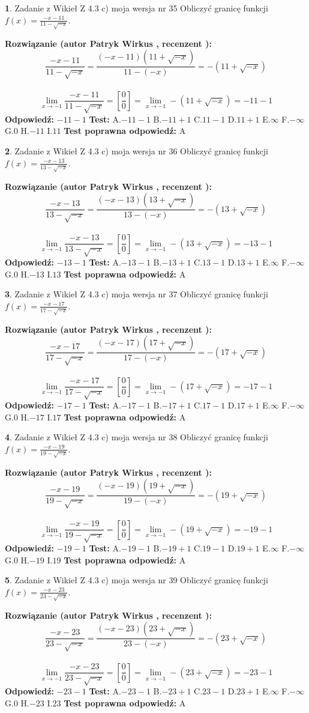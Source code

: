 \documentclass[12pt, a4paper]{article}
\theoremstyle{definition} %
\newtheorem{zad}{}
\newcommand{\zadStart}[1]{\begin{zad}#1\newline}
\newcommand{\zadStop}{\end{zad}}
\newcommand{\rozwStart}[2]{\noindent \textbf{Rozwiązanie (autor #1 , recenzent #2): }\newline}
\newcommand{\rozwStop}{\newline}
\newcommand{\odpStart}{\noindent \textbf{Odpowiedź:}\newline}
\newcommand{\odpStop}{\newline}
\newcommand{\testStart}{\noindent \textbf{Test:}\newline}
\newcommand{\testStop}{\newline}
\newcommand{\kluczStart}{\noindent \textbf{Test poprawna odpowiedź:}\newline}
\newcommand{\kluczStop}{\newline}
\begin{document}
\zadStart{Zadanie z Wikieł Z 4.3 c) moja wersja nr 35}
Obliczyć granicę funkcji $f(x)=\frac{-x-11}{11-\sqrt{-x}}$.
\zadStop
\rozwStart{Patryk Wirkus}{}
$$\frac{-x-11}{11-\sqrt{-x}}=\frac{(-x-11)(11+\sqrt{-x})}{11-(-x)}=-(11+\sqrt{-x})$$
\\
$$\lim\limits_{x\to-1}\frac{-x-11}{11-\sqrt{-x}}=[\frac{0}{0}]=\lim\limits_{x\to-1}-(11+\sqrt{-x}) =-11-1$$
\rozwStop
\odpStart
$-11-1$
\odpStop
\testStart
A.$-11-1$
B.$-11+1$
C.$11-1$
D.$11+1$
E.$\infty$
F.$-\infty$
G.$0$
H.$-11$
I.$11$
\testStop
\kluczStart
A
\kluczStop



\zadStart{Zadanie z Wikieł Z 4.3 c) moja wersja nr 36}
Obliczyć granicę funkcji $f(x)=\frac{-x-13}{13-\sqrt{-x}}$.
\zadStop
\rozwStart{Patryk Wirkus}{}
$$\frac{-x-13}{13-\sqrt{-x}}=\frac{(-x-13)(13+\sqrt{-x})}{13-(-x)}=-(13+\sqrt{-x})$$
\\
$$\lim\limits_{x\to-1}\frac{-x-13}{13-\sqrt{-x}}=[\frac{0}{0}]=\lim\limits_{x\to-1}-(13+\sqrt{-x}) =-13-1$$
\rozwStop
\odpStart
$-13-1$
\odpStop
\testStart
A.$-13-1$
B.$-13+1$
C.$13-1$
D.$13+1$
E.$\infty$
F.$-\infty$
G.$0$
H.$-13$
I.$13$
\testStop
\kluczStart
A
\kluczStop



\zadStart{Zadanie z Wikieł Z 4.3 c) moja wersja nr 37}
Obliczyć granicę funkcji $f(x)=\frac{-x-17}{17-\sqrt{-x}}$.
\zadStop
\rozwStart{Patryk Wirkus}{}
$$\frac{-x-17}{17-\sqrt{-x}}=\frac{(-x-17)(17+\sqrt{-x})}{17-(-x)}=-(17+\sqrt{-x})$$
\\
$$\lim\limits_{x\to-1}\frac{-x-17}{17-\sqrt{-x}}=[\frac{0}{0}]=\lim\limits_{x\to-1}-(17+\sqrt{-x}) =-17-1$$
\rozwStop
\odpStart
$-17-1$
\odpStop
\testStart
A.$-17-1$
B.$-17+1$
C.$17-1$
D.$17+1$
E.$\infty$
F.$-\infty$
G.$0$
H.$-17$
I.$17$
\testStop
\kluczStart
A
\kluczStop



\zadStart{Zadanie z Wikieł Z 4.3 c) moja wersja nr 38}
Obliczyć granicę funkcji $f(x)=\frac{-x-19}{19-\sqrt{-x}}$.
\zadStop
\rozwStart{Patryk Wirkus}{}
$$\frac{-x-19}{19-\sqrt{-x}}=\frac{(-x-19)(19+\sqrt{-x})}{19-(-x)}=-(19+\sqrt{-x})$$
\\
$$\lim\limits_{x\to-1}\frac{-x-19}{19-\sqrt{-x}}=[\frac{0}{0}]=\lim\limits_{x\to-1}-(19+\sqrt{-x}) =-19-1$$
\rozwStop
\odpStart
$-19-1$
\odpStop
\testStart
A.$-19-1$
B.$-19+1$
C.$19-1$
D.$19+1$
E.$\infty$
F.$-\infty$
G.$0$
H.$-19$
I.$19$
\testStop
\kluczStart
A
\kluczStop



\zadStart{Zadanie z Wikieł Z 4.3 c) moja wersja nr 39}
Obliczyć granicę funkcji $f(x)=\frac{-x-23}{23-\sqrt{-x}}$.
\zadStop
\rozwStart{Patryk Wirkus}{}
$$\frac{-x-23}{23-\sqrt{-x}}=\frac{(-x-23)(23+\sqrt{-x})}{23-(-x)}=-(23+\sqrt{-x})$$
\\
$$\lim\limits_{x\to-1}\frac{-x-23}{23-\sqrt{-x}}=[\frac{0}{0}]=\lim\limits_{x\to-1}-(23+\sqrt{-x}) =-23-1$$
\rozwStop
\odpStart
$-23-1$
\odpStop
\testStart
A.$-23-1$
B.$-23+1$
C.$23-1$
D.$23+1$
E.$\infty$
F.$-\infty$
G.$0$
H.$-23$
I.$23$
\testStop
\kluczStart
A
\kluczStop
\end{document}
